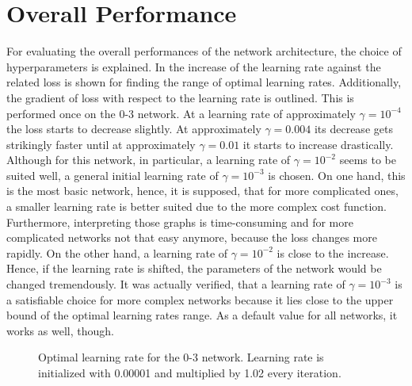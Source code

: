 \section{Overall Performance}
\label{sec:results-overall}
For evaluating the overall performances of the network architecture, the choice of hyperparameters is explained.
In  the increase of the learning rate against the related loss is shown for finding the range of optimal learning rates.
Additionally, the gradient of loss with respect to the learning rate is outlined.
This is performed once on the 0-3 network.
At a learning rate of approximately $\gamma = 10^{-4}$ the loss starts to decrease slightly.
At approximately $\gamma=0.004$ its decrease gets strikingly faster until at approximately $\gamma=0.01$ it starts to increase drastically.
Although for this network, in particular, a learning rate of $\gamma=10^{-2}$ seems to be suited well, a general initial learning rate of $\gamma = 10^{-3}$ is chosen.
On one hand, this is the most basic network, hence, it is supposed, that for more complicated ones, a smaller learning rate is better suited due to the more complex cost function.
Furthermore, interpreting those graphs is time-consuming and for more complicated networks not that easy anymore, because the loss changes more rapidly.
On the other hand, a learning rate of $\gamma=10^{-2}$ is close to the increase.
Hence, if the learning rate is shifted, the parameters of the network would be changed tremendously.
It was actually verified, that a learning rate of $\gamma=10^{-3}$ is a satisfiable choice for more complex networks because it lies close to the upper bound of the optimal learning rates range.
As a default value for all networks, it works as well, though.
\begin{figure}
	\setlength{}
	\setlength{}
	\centering
	\begin{subfigure}{.5\textwidth}
		\centering
		
	\end{subfigure}%
	\begin{subfigure}{.5\textwidth}
		\centering
		
	\end{subfigure}
	\caption[Optimal learning rate for the 0-3 network]{Optimal learning rate for the 0-3 network. Learning rate is initialized with 0.00001 and multiplied by 1.02 every iteration.}
	\label{fig:optimal-learning-rate}
\end{figure}

